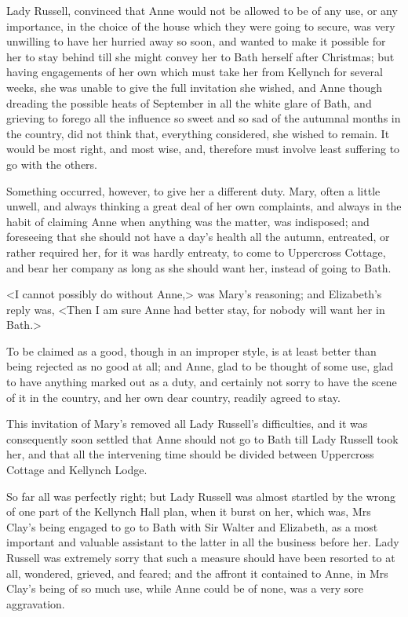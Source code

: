 Lady Russell, convinced that Anne would not be allowed to be of any use, or any importance, in the choice of the house which they were going to secure, was very unwilling to have her hurried away so soon, and wanted to make it possible for her to stay behind till she might convey her to Bath herself after Christmas; but having engagements of her own which must take her from Kellynch for several weeks, she was unable to give the full invitation she wished, and Anne though dreading the possible heats of September in all the white glare of Bath, and grieving to forego all the influence so sweet and so sad of the autumnal months in the country, did not think that, everything considered, she wished to remain. It would be most right, and most wise, and, therefore must involve least suffering to go with the others.

Something occurred, however, to give her a different duty. Mary, often a little unwell, and always thinking a great deal of her own complaints, and always in the habit of claiming Anne when anything was the matter, was indisposed; and foreseeing that she should not have a day's health all the autumn, entreated, or rather required her, for it was hardly entreaty, to come to Uppercross Cottage, and bear her company as long as she should want her, instead of going to Bath.

<I cannot possibly do without Anne,> was Mary's reasoning; and Elizabeth's reply was, <Then I am sure Anne had better stay, for nobody will want her in Bath.>

To be claimed as a good, though in an improper style, is at least better than being rejected as no good at all; and Anne, glad to be thought of some use, glad to have anything marked out as a duty, and certainly not sorry to have the scene of it in the country, and her own dear country, readily agreed to stay.

This invitation of Mary's removed all Lady Russell's difficulties, and it was consequently soon settled that Anne should not go to Bath till Lady Russell took her, and that all the intervening time should be divided between Uppercross Cottage and Kellynch Lodge.

So far all was perfectly right; but Lady Russell was almost startled by the wrong of one part of the Kellynch Hall plan, when it burst on her, which was, Mrs Clay's being engaged to go to Bath with Sir Walter and Elizabeth, as a most important and valuable assistant to the latter in all the business before her. Lady Russell was extremely sorry that such a measure should have been resorted to at all, wondered, grieved, and feared; and the affront it contained to Anne, in Mrs Clay's being of so much use, while Anne could be of none, was a very sore aggravation.

